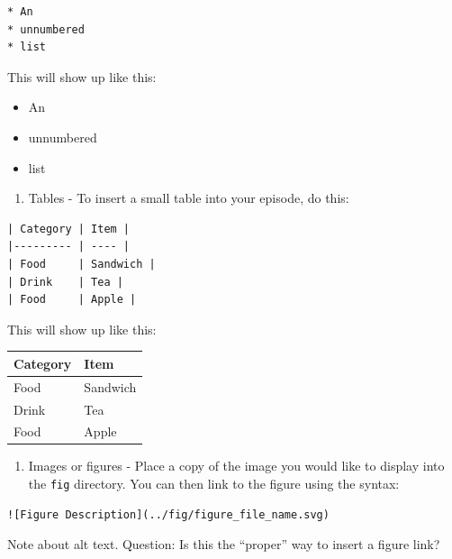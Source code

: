 \documentclass[]{book}
\providecommand{\tightlist}{%
  \setlength{\itemsep}{0pt}\setlength{\parskip}{0pt}}
\begin{document}
\begin{verbatim}
* An
* unnumbered
* list
\end{verbatim}

This will show up like this:

\begin{itemize}
\tightlist
\item
  An
\item
  unnumbered
\item
  list
\end{itemize}

\begin{enumerate}
\def\labelenumi{\arabic{enumi}.}
\tightlist
\item
  Tables - To insert a small table into your episode, do this:
\end{enumerate}

\begin{verbatim}
| Category | Item | 
|--------- | ---- |
| Food     | Sandwich |
| Drink    | Tea | 
| Food     | Apple |
\end{verbatim}

This will show up like this:

\begin{longtable}[]{@{}ll@{}}
\toprule
Category & Item\tabularnewline
\midrule
\endhead
Food & Sandwich\tabularnewline
Drink & Tea\tabularnewline
Food & Apple\tabularnewline
\bottomrule
\end{longtable}

\begin{enumerate}
\def\labelenumi{\arabic{enumi}.}
\tightlist
\item
  Images or figures - Place a copy of the image you would like to display into the \texttt{fig} directory. You can
  then link to the figure using the syntax:
\end{enumerate}

\begin{verbatim}
![Figure Description](../fig/figure_file_name.svg)
\end{verbatim}

Note about alt text. Question: Is this the ``proper'' way to insert a figure link?
\end{document}
